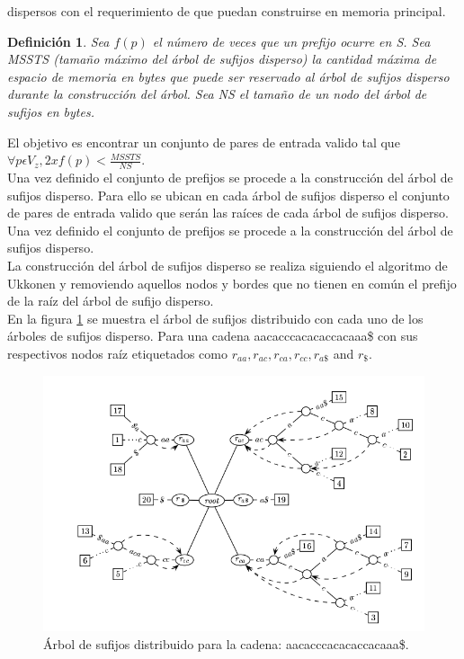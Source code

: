 \documentclass[11pt,a4paper,english]{article}
\newtheorem{mydef}{Definición}
\begin{document}
dispersos con el requerimiento de que puedan construirse en memoria principal.
\begin{mydef}
Sea $f(p)$ el número de veces que un prefijo ocurre en S. Sea MSSTS (tamaño máximo del árbol de sufijos disperso) la cantidad
máxima de espacio de memoria en bytes que puede ser reservado al árbol de sufijos disperso durante la construcción del árbol. 
Sea NS el tamaño de un nodo del árbol de sufijos en bytes.
\end{mydef}
El objetivo es encontrar un conjunto de pares de entrada valido tal que $\forall p \epsilon V_{z}, 2xf(p)<\frac{MSSTS}{NS}$.\\
Una vez definido el conjunto de prefijos se procede a la construcción del árbol de sufijos disperso. Para ello se ubican en cada
árbol de sufijos disperso el conjunto de pares de entrada valido que serán las raíces de cada árbol de sufijos disperso. Una vez 
definido el conjunto de prefijos se procede a la construcción del árbol de sufijos disperso.\\
La construcción del árbol de sufijos disperso se realiza siguiendo el algoritmo de Ukkonen y removiendo aquellos nodos y bordes
que no tienen en común el prefijo de la raíz del árbol de sufijo disperso.\\
En la figura \ref{fig:dst} se muestra el árbol de sufijos distribuido con cada uno de los árboles de sufijos disperso. Para una
cadena aacacccacacaccacaaa\$ con sus respectivos nodos raíz etiquetados como $r_{aa}, r_{ac}, r_{ca}, r_{cc}, r_{a\$}$ and $r_{\$}$.
\begin{figure}[h]
\begin{center}
\includegraphics[scale=0.4]{dst2.png}
\caption{Árbol de sufijos distribuido para la cadena: aacacccacacaccacaaa\$.}
\label{fig:dst}
\end{center}
\end{figure}
\end{document}
